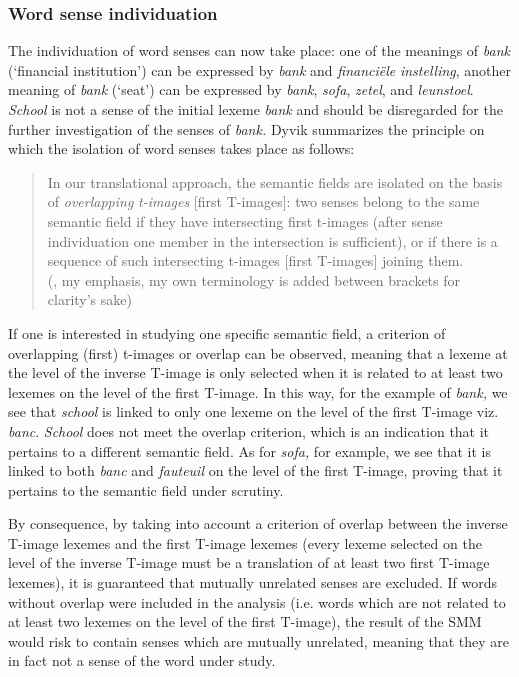 \subsubsection{Word sense individuation}
\label{sec:3.4.3.4}
The individuation of word senses can now take place: one of the meanings of \textit{bank} (`financial institution') can be expressed by \textit{bank} and \textit{financiële} \textit{instelling}, another meaning of \textit{bank} (`seat') can be expressed by \textit{bank}, \textit{sofa}, \textit{zetel}, and \textit{leunstoel}. \textit{School} is not a sense of the initial lexeme \textit{bank} and should be disregarded for the further investigation of the senses of \textit{bank.} Dyvik summarizes the principle on which the isolation of word senses takes place as follows:

\begin{quote}
In our translational approach, the semantic fields are isolated on the basis of \textit{overlapping} \textit{t-images} [first T-images]: two senses belong to the same semantic field if they have intersecting first t-images (after sense individuation one member in the intersection is sufficient), or if there is a sequence of such intersecting t-images [first T-images] joining them.\\(\citealt[33]{langemets_translations_2005}, my emphasis, my own terminology is added between brackets for clarity’s sake)
\end{quote}

If one is interested in studying one specific semantic field, a criterion of overlapping (first) t-images or overlap can be observed, meaning that a lexeme at the level of the inverse T-image is only selected when it is related to at least two lexemes on the level of the first T-image. In this way, for the example of \textit{bank,} we see that \textit{school} is linked to only one lexeme on the level of the first T-image viz. \textit{banc}. \textit{School} does not meet the overlap criterion, which is an indication that it pertains to a different semantic field. As for \textit{sofa,} for example, we see that it is linked to both \textit{banc} and \textit{fauteuil} on the level of the first T-image, proving that it pertains to the semantic field under scrutiny.

By consequence, by taking into account a criterion of overlap between the inverse T-image lexemes and the first T-image lexemes (every lexeme selected on the level of the inverse T-image must be a translation of at least two first T-image lexemes), it is guaranteed that mutually unrelated senses are excluded. If words without overlap were included in the analysis (i.e. words which are not related to at least two lexemes on the level of the first T-image), the result of the SMM would risk to contain senses which are mutually unrelated, meaning that they are in fact not a sense of the word under study.

